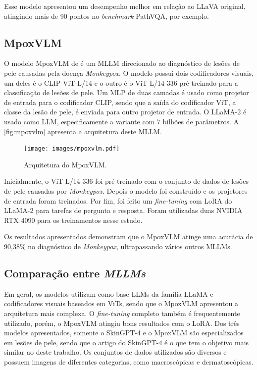 Esse modelo apresentou um desempenho melhor em relação ao \ac{LLaVA} original, atingindo mais de 90 pontos no \textit{benchmark} PathVQA, por exemplo.

\subsection{MpoxVLM}

O modelo MpoxVLM de \textcite{cao2024mpoxvlm} é um \ac{MLLM} direcionado ao diagnóstico de lesões de pele causadas pela doença \textit{Monkeypox}. O modelo possui dois
codificadores visuais, um deles é o \ac{CLIP} \ac{ViT}-L/14 e o outro é o \ac{ViT}-L/14-336 pré-treinado para a classificação de lesões de pele. Um \ac{MLP} de duas camadas
é usado como projetor de entrada para o codificador \ac{CLIP}, sendo que a saída do codificador \ac{ViT}, a classe da lesão de pele, é enviada para outro projetor de
entrada. O \ac{LLaMA}-2 é usado como \ac{LLM}, especificamente a variante com 7 bilhões de parâmetros. A \autoref{fig:mpoxvlm} apresenta a arquitetura deste \ac{MLLM}.

\begin{figure}[ht]
    \centering
    \caption{\small Arquitetura do MpoxVLM.}
    \texttt{[image: images/mpoxvlm.pdf]}
    \label{fig:mpoxvlm}
\end{figure}

Inicialmente, o \ac{ViT}-L/14-336 foi pré-treinado com o conjunto de dados de lesões de pele causadas por \textit{Monkeypox}. Depois o modelo foi construído e os
projetores de entrada foram treinados. Por fim, foi feito um \textit{fine-tuning} com \ac{LoRA} do \ac{LLaMA}-2 para tarefas de pergunta e resposta. Foram utilizadas
duas NVIDIA RTX 4090 para os treinamentos nesse estudo.

Os resultados apresentados demonstram que o MpoxVLM atinge uma acurácia de 90,38\% no diagnóstico de \textit{Monkeypox}, ultrapassando vários outros \acp{MLLM}.

\subsection{Comparação entre \textit{MLLMs}} %

Em geral, os modelos utilizam como base \acp{LLM} da família \ac{LLaMA} e codificadores visuais baseados em \acp{ViT}, sendo que o MpoxVLM apresentou a arquitetura
mais complexa. O \textit{fine-tuning} completo também é frequentemente utilizado, porém, o MpoxVLM atingiu bons resultados com o \ac{LoRA}. Dos três modelos apresentados,
somente o Skin\ac{GPT}-4 e o MpoxVLM são especializados em lesões de pele, sendo que o artigo do Skin\ac{GPT}-4 é o que tem o objetivo mais similar ao deste trabalho. Os
conjuntos de dados utilizados são diversos e possuem imagens de diferentes categorias, como macroscópicas e dermatoscópicas.

